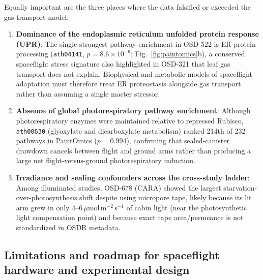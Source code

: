 \documentclass[preprint,11pt,numbers,sort&compress]{elsarticle}
\newcommand{\ums}{\ensuremath{\mu\mathrm{mol\,m^{-2}\,s^{-1}}}}
\begin{document}
Equally important are the three places where the data falsified or exceeded the gas-transport model:
\begin{enumerate}
    \item \textbf{Dominance of the endoplasmic reticulum unfolded protein response (UPR)}: The single strongest pathway enrichment in OSD-522 is ER protein processing (\texttt{ath04141}, $p = 8.6\times 10^{-9}$; Fig.~\ref{fig:paintomics}b), a conserved spaceflight stress signature also highlighted in OSD-321 \citep{osd321} that leaf gas transport does not explain. Biophysical and metabolic models of spaceflight adaptation must therefore treat ER proteostasis alongside gas transport rather than assuming a single master stressor.
    \item \textbf{Absence of global photorespiratory pathway enrichment}: Although photorespiratory enzymes were maintained relative to repressed Rubisco, \texttt{ath00630} (glyoxylate and dicarboxylate metabolism) ranked 214th of 232 pathways in PaintOmics ($p = 0.994$), confirming that sealed-canister drawdown cancels between flight and ground arms rather than producing a large net flight-versus-ground photorespiratory induction.
    \item \textbf{Irradiance and sealing confounders across the cross-study ladder}: Among illuminated studies, OSD-678 (CARA) showed the largest starvation-over-photosynthesis shift despite using micropore tape, likely because its lit arm grew in only $4\text{--}6\,\ums$ of cabin light (near the photosynthetic light compensation point) and because exact tape area/permeance is not standardized in OSDR metadata.
\end{enumerate}

\subsection{Limitations and roadmap for spaceflight hardware and experimental design}
\end{document}
